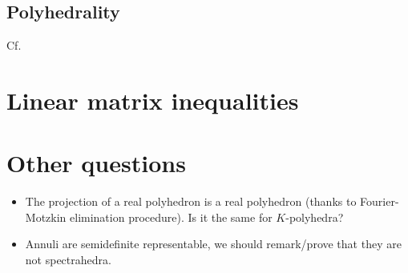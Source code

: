 \documentclass[a4paper,12pt]{article}
\begin{document}
\subsection{Polyhedrality}
Cf. \cite{bhardwaj2015deciding}

\section{Linear matrix inequalities}


\section{Other questions}
\begin{itemize}
\item The projection of a real polyhedron is a real polyhedron (thanks to Fourier-Motzkin elimination procedure). Is it the same for $K$-polyhedra?
\item Annuli are semidefinite representable, we should remark/prove that they are not spectrahedra.
\end{itemize}
\end{document}
